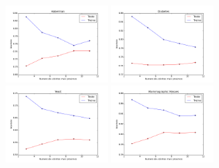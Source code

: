 \documentclass[12pt, a4paper]{article}
\begin{document}
\begin{landscape}
\begin{figure}[!htb]
    \includegraphics[width=0.35\textwidth]{Habermans_Survival/knn.png}    
    \includegraphics[width=0.35\textwidth]{Pima_Indians_Diabetes/knn.png}
    \includegraphics[width=0.35\textwidth]{Yeast/knn.png}
    \includegraphics[width=0.35\textwidth]{Mammographic_Mass/knn.png}
\end{figure}
\end{landscape}
\end{document}
